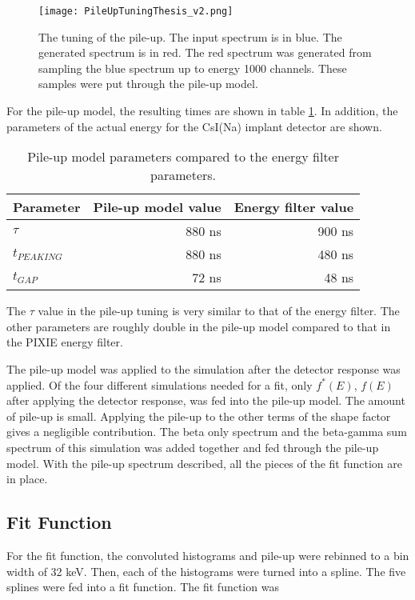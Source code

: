 \documentclass[../MaxHughesThesis.tex]{subfiles}
\begin{document}
\begin{figure}[!htb]
	\centerline{\texttt{[image: PileUpTuningThesis\_v2.png]}}
	\caption{The tuning of the pile-up.
		 The input spectrum is in blue.
		 The generated spectrum is in red.
		 The red spectrum was generated from sampling the blue spectrum up to energy 1000 channels.
		 These samples were put through the pile-up model.}
	\label{fig:pileuptune}
\end{figure}
For the pile-up model, the resulting times are shown in table \ref{tab:tunepileupmodel}.
In addition, the parameters of the actual energy for the CsI(Na) implant detector are shown.

\begin{table}[!hbt]
	\centering
	\caption{Pile-up model parameters compared to the energy filter parameters.}
		\begin{tabular}{lrr}
		Parameter & Pile-up model value & Energy filter value \\ \hline
		$\tau$ & 880 ns & 900 ns \\
		$t_{PEAKING}$ & 880 ns & 480 ns \\
		$t_{GAP}$ & 72 ns & 48 ns  
		\end{tabular}
		\label{tab:tunepileupmodel}
\end{table}
The $\tau$ value in the pile-up tuning is very similar to that of the energy filter.
The other parameters are roughly double in the pile-up model compared to that in the PIXIE energy filter.

The pile-up model was applied to the simulation after the detector response was applied. 
Of the four different simulations needed for a fit, only $f^{*}(E)$, $f(E)$ after applying the detector response, was fed into the pile-up model.
The amount of pile-up is small. 
Applying the pile-up to the other terms of the shape factor gives a negligible contribution.
The beta only spectrum and the beta-gamma sum spectrum of this simulation was added together and fed through the pile-up model.
With the pile-up spectrum described, all the pieces of the fit function are in place.

\subsection{Fit Function}
For the fit function, the convoluted histograms and pile-up were rebinned to a bin width of 32 keV.
Then, each of the histograms were turned into a spline. 
The five splines were fed into a fit function.
The fit function was
\end{document}
